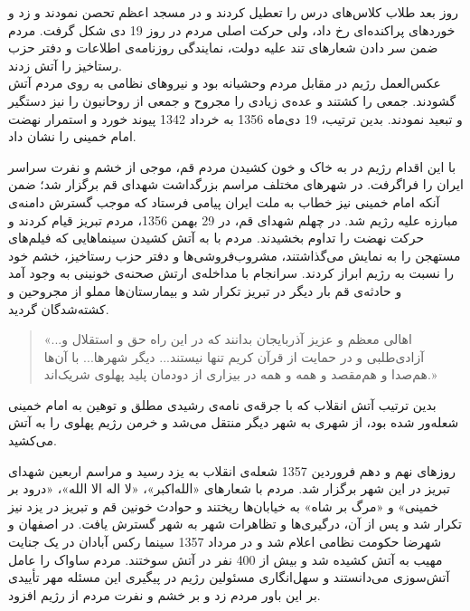 \documentclass{article}
\begin{document}
\par
روز بعد طلاب کلاس‌های درس را تعطیل کردند و در مسجد اعظم تحصن نمودند و زد و خوردهای پراکنده‌ای رخ داد، ولی حرکت اصلی مردم در روز 19 دی شکل گرفت. مردم ضمن سر دادن شعارهای تند علیه دولت، نمایندگی روزنامه‌ی اطلاعات و دفتر حزب رستاخیز را آتش زدند. \\ عکس‌العمل رژیم در مقابل مردم وحشیانه بود و نیروهای نظامی به روی مردم آتش گشودند. جمعی را کشتند و عده‌ی زیادی را مجروح و جمعی از روحانیون را نیز دستگیر و تبعید نمودند. بدین ترتیب، 19 دی‌ماه 1356 به خرداد 1342 پیوند خورد و استمرار نهضت امام خمینی را نشان داد.
\par
با این اقدام رژیم در به خاک و خون کشیدن مردم قم، موجی از خشم و نفرت سراسر ایران را فراگرفت. در شهرهای مختلف مراسم بزرگداشت شهدای قم برگزار شد؛ ضمن آنکه امام خمینی نیز خطاب به ملت ایران پیامی فرستاد که موجب گسترش دامنه‌ی مبارزه علیه رژیم شد. در چهلم شهدای قم، در 29 بهمن 1356، مردم تبریز قیام کردند و حرکت نهضت را تداوم بخشیدند. مردم با به آتش کشیدن سینماهایی که فیلم‌های مستهجن را به نمایش می‌گذاشتند، مشروب‌فروشی‌ها و دفتر حزب رستاخیز، خشم خود را نسبت به رژیم ابراز کردند. سرانجام با مداخله‌ی ارتش صحنه‌ی خونینی به وجود آمد و حادثه‌ی قم بار دیگر در تبریز تکرار شد و بیمارستان‌ها مملو از مجروحین و کشته‌شدگان گردید.
\par
\begin{quote}
«...اهالی معظم و عزیز آذربایجان بدانند که در این راه حق و استقلال و آزادی‌طلبی و در حمایت از قرآن کریم تنها نیستند... دیگر شهرها... با آن‌ها هم‌صدا و هم‌مقصد و همه و همه در بیزاری از دودمان پلید پهلوی شریک‌اند.» 
\end{quote}
بدین ترتیب آتش انقلاب که با جرقه‌ی نامه‌ی رشیدی مطلق و توهین به امام خمینی شعله‌ور شده بود، از شهری به شهر دیگر منتقل می‌شد و خرمن رژیم پهلوی را به آتش می‌کشید.
\par
روزهای نهم و دهم فروردین 1357 شعله‌ی انقلاب به یزد رسید و مراسم اربعین شهدای تبریز در این شهر برگزار شد. مردم با شعارهای «الله‌اکبر»، «لا اله الا الله»، «درود بر خمینی» و «مرگ بر شاه» به خیابان‌ها ریختند و حوادث خونین قم و تبریز در یزد نیز تکرار شد و پس از آن، درگیری‌ها و تظاهرات شهر به شهر گسترش یافت. در اصفهان و شهرضا حکومت نظامی اعلام شد و در مرداد 1357 سینما رکس آبادان در یک جنایت مهیب به آتش کشیده شد و بیش از 400 نفر در آتش سوختند. مردم ساواک را عامل آتش‌سوزی می‌دانستند و سهل‌انگاری مسئولین رژیم در پیگیری این مسئله مهر تأییدی بر این باور مردم زد و بر خشم و نفرت مردم از رژیم افزود. 
\end{document}
